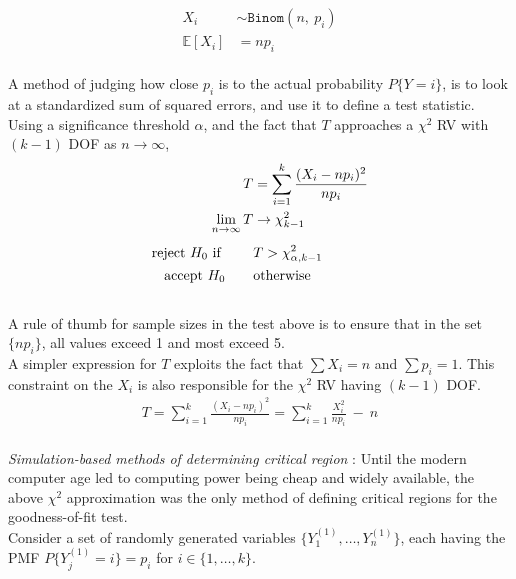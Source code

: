 \begin{align}
	X_i &\sim \texttt{Binom} (n,\ p_i) \\
	\mathbb{E}[X_i] &= np_i
\end{align}\\

A method of judging how close $ p_i $ is to the actual probability $ P\{Y = i\} $, is to look at a standardized sum of squared errors, and use it to define a test statistic.\\

Using a significance threshold $ \alpha $, and the fact that $ T $ approaches a $ \chi^2 $ RV with $ (k-1) $ DOF as $ n \to \infty $,\\


\begin{align}
	T &= \sum\limits_{i=1}^{k} \frac{(X_i - np_i)^2}{np_i}  \\
	\lim\limits_{n \to \infty} T &\to \chi^2_{k-1} \\[1ex]
	\text{reject $ H_0 $ if } \qquad & T > \chi^2_{\alpha, k-1}  \nonumber \\
	\text{accept $ H_0 $} \qquad & \text{otherwise}
\end{align}\\

A rule of thumb for sample sizes in the test above is to ensure that in the set $ \{np_i\} $, all values exceed 1 and most exceed 5.\\

A simpler expression for $ T $ exploits the fact that $ \sum X_i = n $ and $ \sum p_i = 1 $. This constraint on the $ {X_i} $ is also responsible for the $ \chi^2 $ RV having $ (k-1) $ DOF.\\

\begin{align}
	T = \sum\limits_{i=1}^{k} \frac{(X_i - np_i)^2}{np_i} = \sum\limits_{i=1}^{k} \frac{X_i^2}{np_i}\ -\ n
\end{align}\\

\textit{Simulation-based methods of determining critical region} : Until the modern computer age led to computing power being cheap and widely available, the above $ \chi^2 $ approximation was the only method of defining critical regions for the goodness-of-fit test.\\

Consider a set of randomly generated variables $ \{Y_1^{(1)}, \dots, Y_n^{(1)}\} $, each having the PMF $ P\{Y_j^{(1)} = i\} = p_i $ for $ i \in \{1, \dots, k\} $.\\

